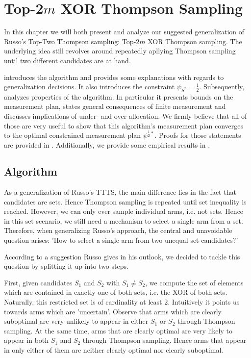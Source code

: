 \chapter{Top-2$m$ XOR Thompson Sampling}

In this chapter we will both present and analyze our suggested generalization of Russo's Top-Two Thompson sampling: Top-2$m$ XOR Thompson sampling. The underlying idea still revolves around repeatedly apllying Thompson sampling until two different candidates are at hand.

 introduces the algorithm and provides some explanations with regards to generalization decisions. It also introduces the constraint $\psi_{S^*} = \frac{1}{2}$. Subsequently,  analyzes properties of the algorithm. In particular it presents bounds on the measurement plan, states general consequences of finite measurement and discusses implications of under- and over-allocation. We firmly believe that all of those are very useful to show that this algorithm's measurement plan converges to the optimal constrained measurement plan $\psi^{\frac{1}{2}*}$. Proofs for those statements are provided in . Additionally, we provide some empirical results in .

\section{Algorithm}\label{section:algorithm}
As a generalization of Russo's TTTS, the main difference lies in the fact that candidates are sets. Hence Thompson sampling is repeated until set inequality is reached. However, we can only ever sample individual arms, i.e. not sets. Hence in this set scenario, we still need a mechanism to select a single arm from a set. Therefore, when generalizing Russo's approach, the central and unavoidable question arises: 'How to select a single arm from two unequal set candidates?'

According to a suggestion Russo gives in his outlook, we decided to tackle this question by splitting it up into two steps.

First, given candidates $S_1$ and $S_2$ with $S_1 \neq S_2$, we compute the set of elements which are contained in exactly one of both sets, i.e. the XOR of both sets. Naturally, this restricted set is of cardinality at least 2. Intuitively it points us towards arms which are 'uncertain'. Observe that arms which are clearly suboptimal are very unlikely to appear in either $S_1$ or $S_2$ through Thompson sampling. At the same time, arms that are clearly optimal are very likely to appear in both $S_1$ and $S_2$ through Thompson sampling. Hence arms that appear in only either of them are neither clearly optimal nor clearly suboptimal.

